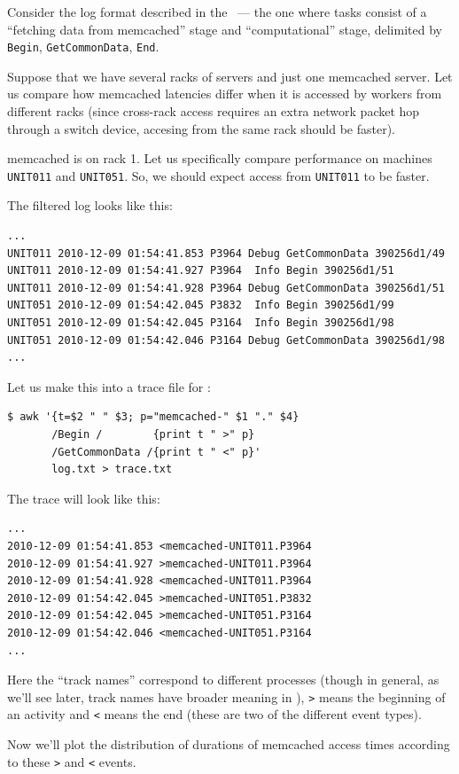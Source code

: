 \documentclass{article}
\begin{document}
Consider the log format described in the ~--- the one where tasks consist of a ``fetching data from memcached'' stage and ``computational'' stage, delimited by \verb|Begin|, \verb|GetCommonData|, \verb|End|.

Suppose that we have several racks of servers and just one memcached server. Let us compare how memcached latencies differ when it is accessed by workers from different racks (since cross-rack access requires an extra network packet hop through a switch device, accesing from the same rack should be faster).

memcached is on rack 1. Let us specifically compare performance on machines \verb|UNIT011| and \verb|UNIT051|. So, we should expect access from \verb|UNIT011| to be faster.

The filtered log looks like this:
\begin{verbatim}
...
UNIT011 2010-12-09 01:54:41.853 P3964 Debug GetCommonData 390256d1/49
UNIT011 2010-12-09 01:54:41.927 P3964  Info Begin 390256d1/51
UNIT011 2010-12-09 01:54:41.928 P3964 Debug GetCommonData 390256d1/51
UNIT051 2010-12-09 01:54:42.045 P3832  Info Begin 390256d1/99
UNIT051 2010-12-09 01:54:42.045 P3164  Info Begin 390256d1/98
UNIT051 2010-12-09 01:54:42.046 P3164 Debug GetCommonData 390256d1/98
...
\end{verbatim}

Let us make this into a trace file for \timeplot{}:
\begin{verbatim}
$ awk '{t=$2 " " $3; p="memcached-" $1 "." $4}
       /Begin /        {print t " >" p} 
       /GetCommonData /{print t " <" p}'
       log.txt > trace.txt
\end{verbatim}

The trace will look like this:
\begin{verbatim}
...
2010-12-09 01:54:41.853 <memcached-UNIT011.P3964
2010-12-09 01:54:41.927 >memcached-UNIT011.P3964
2010-12-09 01:54:41.928 <memcached-UNIT011.P3964
2010-12-09 01:54:42.045 >memcached-UNIT051.P3832
2010-12-09 01:54:42.045 >memcached-UNIT051.P3164
2010-12-09 01:54:42.046 <memcached-UNIT051.P3164
...
\end{verbatim}

Here the ``track names'' correspond to different processes (though in general, as we'll see later, track names have broader meaning in \timeplot{}), \verb|>| means the beginning of an activity and \verb|<| means the end (these are two of the different event types).

Now we'll plot the distribution of durations of memcached access times according to these \verb|>| and \verb|<| events.
\end{document}
